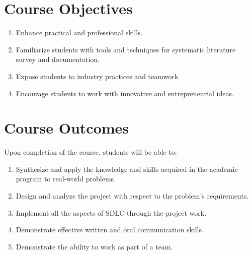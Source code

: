 \section*{Course Objectives}
\begin{enumerate}[leftmargin=*]
\item Enhance practical and professional skills.
\item Familiarize students with tools and techniques for systematic literature survey and documentation.
\item Expose students to industry practices and teamwork.
\item Encourage students to work with innovative and entrepreneurial ideas.
\end{enumerate}
\section*{Course Outcomes}
Upon completion of the course, students will be able to:
\begin{enumerate}[leftmargin=*]
\item Synthesize and apply the knowledge and skills acquired in the academic program to real-world problems.
\item Design and analyze the project with respect to the problem's requirements.
\item Implement all the aspects of SDLC through the project work.
\item Demonstrate effective written and oral communication skills.
\item Demonstrate the ability to work as part of a team.
\end{enumerate}
